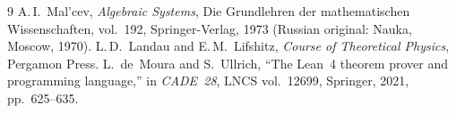 \documentclass[11pt,a4paper]{article}
\theoremstyle{plain}
\theoremstyle{definition}
\begin{document}
\begin{thebibliography}{9}
A.\,I.~Mal'cev, \emph{Algebraic Systems}, Die Grundlehren der mathematischen Wissenschaften, vol.~192, Springer-Verlag, 1973 (Russian original: Nauka, Moscow, 1970).
L.\,D.~Landau and E.\,M.~Lifshitz, \emph{Course of Theoretical Physics}, Pergamon Press.
L.~de~Moura and S.~Ullrich, ``The Lean~4 theorem prover and programming language,'' in \emph{CADE~28}, LNCS vol.~12699, Springer, 2021, pp.~625--635.
\end{thebibliography}
\end{document}

